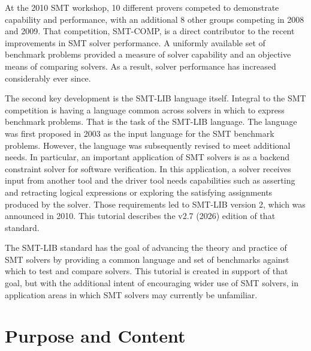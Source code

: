 \documentclass[12pt,oneside]{report}
\begin{document}
At the 2010 SMT workshop, 10 different provers competed to demonstrate capability and performance, with an additional 8 other groups competing in 2008 and 2009.
That competition, SMT-COMP, is a direct contributor to the recent improvements in SMT solver performance. A uniformly available set of benchmark problems provided a measure of solver capability and an objective means of comparing solvers.  As a result, solver performance has increased considerably\cite{BDO+08}\cite{SMTCOMP-2010} ever since.

The second key development is the SMT-LIB language itself.
Integral to the SMT competition is having a language common across solvers in which to express benchmark problems. That is the task of the SMT-LIB language.
The language was first proposed in 2003\cite{RanTin-PDPAR-03} as the input language for the SMT benchmark problems. However, the language was subsequently revised to meet additional needs.  In particular, an important application of SMT solvers is as a backend constraint solver for software verification.  In this application, a solver receives input from another tool and the driver tool needs capabilities such as asserting and retracting logical expressions or exploring the satisfying assignments produced by the solver. Those requirements led to SMT-LIB version 2, which was announced in 2010\cite{BarST-SMT-10}.  This tutorial describes the v2.7 (2026) edition of that standard.

The SMT-LIB standard has the goal of advancing the theory and practice of SMT solvers by providing a common language and set of benchmarks against which to test and compare solvers.  This tutorial is created in support of that goal, but with the additional intent of encouraging 
wider use of SMT solvers, in application areas in which SMT solvers may currently be unfamiliar.

\section{Purpose and Content}
\end{document}
